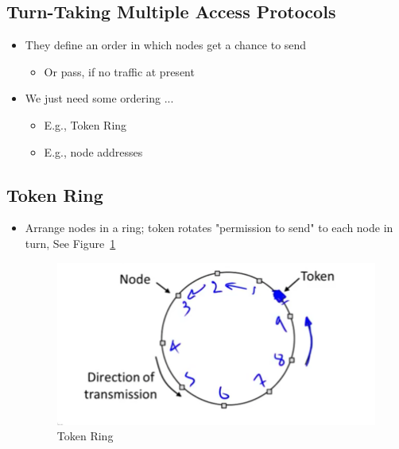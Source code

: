\documentclass[12pt]{ctexart}   %
\begin{document}
	\subsection{Turn-Taking Multiple Access Protocols}
	\begin{itemize}
		\item They define an order in which nodes get a chance to send
		\begin{itemize}
			\item Or pass, if no traffic at present
		\end{itemize}
		
		\item We just need some ordering ...
		\begin{itemize}
			\item E.g., Token Ring
			\item E.g., node addresses
		\end{itemize}
	\end{itemize}
	
	\subsection{Token Ring}
	\begin{itemize}
		\item Arrange nodes in a ring; token rotates "permission to send" to each node in turn, See Figure~\ref{fig:3-5-2}
		
		\begin{figure}[h!] %
		\centering
		 \includegraphics[scale=0.7]{images/3-5-2}
		\caption{ Token Ring }
		 \label{fig:3-5-2}
		 \end{figure}
	\end{itemize}
	
\end{document}
